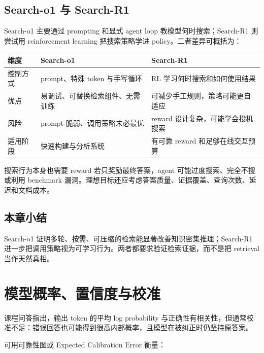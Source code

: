 \documentclass[a4paper]{article}
\begin{document}
\subsection{Search-o1 与 Search-R1}

Search-o1 主要通过 prompting 和显式 agent loop 教模型何时搜索；Search-R1 则尝试用 reinforcement learning 把搜索策略学进 policy。二者差异可概括为：

\begin{table}[H]
\centering
\small
\begin{tabular}{>{\raggedright\arraybackslash}p{3cm}>{\raggedright\arraybackslash}p{4.7cm}>{\raggedright\arraybackslash}p{4.7cm}}
\toprule
\textbf{维度} & \textbf{Search-o1} & \textbf{Search-R1} \\
\midrule
控制方式 & prompt、特殊 token 与手写循环 & RL 学习何时搜索和如何使用结果 \\
优点 & 易调试、可替换检索组件、无需训练 & 可减少手工规则，策略可能更自适应 \\
风险 & prompt 脆弱、调用策略未必最优 & reward 设计复杂，可能学会投机搜索 \\
适用阶段 & 快速构建与分析系统 & 有可靠 reward 和足够在线交互预算 \\
\bottomrule
\end{tabular}
\end{table}

\begin{importantbox}{搜索行为本身也需要 reward}
若只奖励最终答案，agent 可能过度搜索、完全不搜或利用 benchmark 漏洞。理想目标还应考虑答案质量、证据覆盖、查询次数、延迟和文档成本。
\end{importantbox}

\subsection{本章小结}

Search-o1 证明多轮、按需、可压缩的检索能显著改善知识密集推理；Search-R1 进一步把调用策略视为可学习行为。两者都要求验证检索证据，而不是把 retrieval 当作天然真相。

\section{模型概率、置信度与校准}

课程问答指出，输出 token 的平均 log probability 与正确性有相关性，但通常校准不足：错误回答也可能得到很高内部概率，且模型在被纠正时仍坚持原答案。

可用可靠性图或 Expected Calibration Error 衡量：
\end{document}
